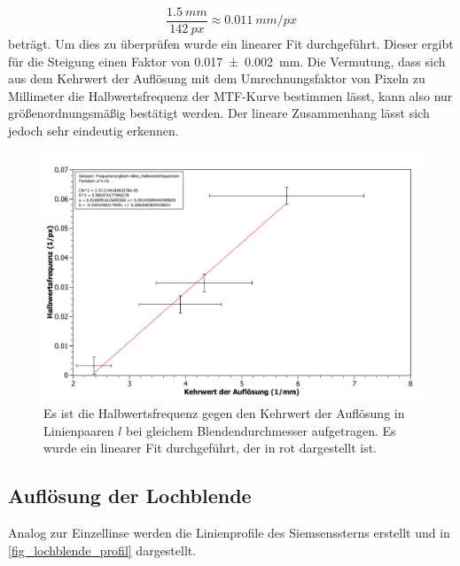 \documentclass[
	a4paper,
	12pt,
	pagesize,
	ngerman
]{scrartcl}
\begin{document}
	\begin{equation*}
		 \frac{\SI{1,5}{mm}}{\SI{142}{px}} \approx \SI{0,011}{mm/px}
	\end{equation*}
	beträgt.
	Um dies zu überprüfen wurde ein linearer Fit durchgeführt.
	Dieser ergibt für die Steigung einen Faktor von \SI{0,017\pm 0,002}{mm}.
	Die Vermutung, dass sich aus dem Kehrwert der Auflösung mit dem Umrechnungsfaktor von Pixeln zu Millimeter die Halbwertsfrequenz der MTF-Kurve bestimmen lässt, kann also nur größenordnungsmäßig bestätigt werden.
	Der lineare Zusammenhang lässt sich jedoch sehr eindeutig erkennen.
	
	\begin{figure}[H]  
		\includegraphics[width=1\textwidth]{fig_Einzellinse_Vergleich}
		\centering
		\caption{
			Es ist die Halbwertsfrequenz gegen den Kehrwert der Auflösung in Linienpaaren $l$ bei gleichem Blendendurchmesser aufgetragen.
			Es wurde ein linearer Fit durchgeführt, der in rot dargestellt ist.
		}
		\label{fig_einzel_vgl}
		\centering
	\end{figure}
	
	
	
	\subsection{Auflösung der Lochblende}
	Analog zur Einzellinse werden die Linienprofile des Siemsenssterns erstellt und in \cref{fig_lochblende_profil} dargestellt.
	
\end{document}
